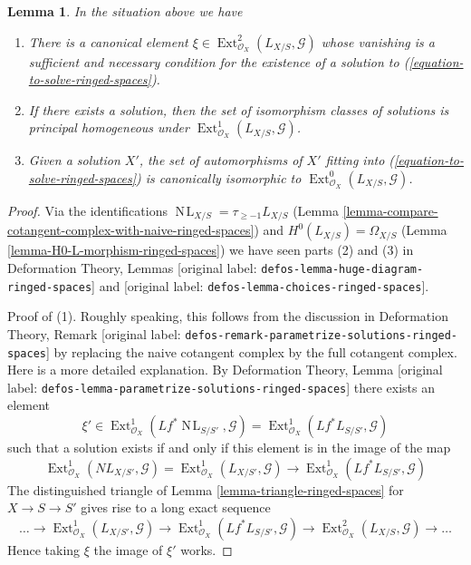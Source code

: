 \documentclass[10pt,a4paper]{article}
\theoremstyle{plain}
\newtheorem{lemma}[subsection]{Lemma}
\theoremstyle{definition}
\theoremstyle{remark}
\numberwithin{equation}{subsection}
\def\Ext{\mathop{\mathrm{Ext}}\nolimits}
\def\NL{\mathop{N\!L}\nolimits}
\begin{document}
\begin{lemma}
\label{lemma-find-obstruction-ringed-spaces}
In the situation above we have
\begin{enumerate}
\item There is a canonical element
$\xi \in \Ext^2_{\mathcal{O}_X}(L_{X/S}, \mathcal{G})$
whose vanishing is a sufficient and necessary condition for the existence
of a solution to (\ref{equation-to-solve-ringed-spaces}).
\item If there exists a solution, then the set of
isomorphism classes of solutions is principal homogeneous under
$\Ext^1_{\mathcal{O}_X}(L_{X/S}, \mathcal{G})$.
\item Given a solution $X'$, the set of automorphisms of $X'$
fitting into (\ref{equation-to-solve-ringed-spaces}) is canonically isomorphic
to $\Ext^0_{\mathcal{O}_X}(L_{X/S}, \mathcal{G})$.
\end{enumerate}
\end{lemma}

\begin{proof}
Via the identifications $\NL_{X/S} = \tau_{\geq -1}L_{X/S}$
(Lemma \ref{lemma-compare-cotangent-complex-with-naive-ringed-spaces})
and
$H^0(L_{X/S}) = \Omega_{X/S}$
(Lemma \ref{lemma-H0-L-morphism-ringed-spaces})
we have seen parts (2) and (3) in
Deformation Theory, Lemmas \textnormal{[original label: \nolinkurl{defos-lemma-huge-diagram-ringed-spaces}]} and
\textnormal{[original label: \nolinkurl{defos-lemma-choices-ringed-spaces}]}.

\medskip\noindent
Proof of (1). Roughly speaking, this follows from the discussion in
Deformation Theory, Remark
\textnormal{[original label: \nolinkurl{defos-remark-parametrize-solutions-ringed-spaces}]}
by replacing the naive cotangent complex by the full cotangent complex.
Here is a more detailed explanation. By
Deformation Theory, Lemma \textnormal{[original label: \nolinkurl{defos-lemma-parametrize-solutions-ringed-spaces}]}
there exists an element
$$
\xi' \in
\Ext^1_{\mathcal{O}_X}(Lf^*\NL_{S/S'}, \mathcal{G}) =
\Ext^1_{\mathcal{O}_X}(Lf^*L_{S/S'}, \mathcal{G})
$$
such that a solution exists if and only if this element is in
the image of the map
$$
\Ext^1_{\mathcal{O}_X}(NL_{X/S'}, \mathcal{G}) =
\Ext^1_{\mathcal{O}_X}(L_{X/S'}, \mathcal{G})
\longrightarrow
\Ext^1_{\mathcal{O}_X}(Lf^*L_{S/S'}, \mathcal{G})
$$
The distinguished triangle of Lemma \ref{lemma-triangle-ringed-spaces}
for $X \to S \to S'$ gives rise to a long exact sequence
$$
\ldots \to
\Ext^1_{\mathcal{O}_X}(L_{X/S'}, \mathcal{G}) \to
\Ext^1_{\mathcal{O}_X}(Lf^*L_{S/S'}, \mathcal{G}) \to
\Ext^2_{\mathcal{O}_X}(L_{X/S}, \mathcal{G}) \to \ldots
$$
Hence taking $\xi$ the image of $\xi'$ works.
\end{proof}
\end{document}
